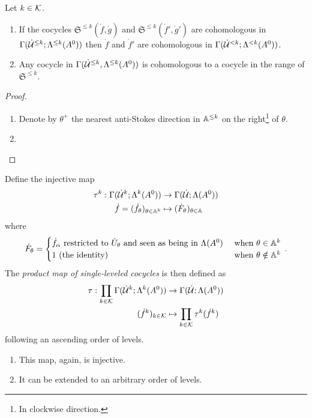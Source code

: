 \begin{lem}
  Let $k\in\mathcal{K}$.
  \begin{enumerate}
    \item If the cocycles $\mathfrak{S}^{\leq k}(\dot f,\dot g)$ and
      $\mathfrak{S}^{\leq k}(\dot f',\dot g')$ are cohomologous in
      $\Gamma(\dot{\mathcal{U}}^{\leq k};\Lambda^{\leq k}(A^0))$
      then $\dot f$ and $\dot f'$ are cohomologous in
      $\Gamma(\dot{\mathcal{U}}^{<k};\Lambda^{<k}(A^0))$.
    \item Any cocycle in $\Gamma(\dot{\mathcal{U}}^{\leq k},\Lambda^{\leq k}(A^0))$ is
      cohomologous to a cocycle in the range of $\mathfrak{S}^{\leq k}$.
  \end{enumerate}
\end{lem}
\begin{proof}
  \begin{enumerate}
    \item Denote by $\theta^+$ the nearest anti-Stokes direction in
      $\mathbb{A}^{\leq k}$ on the right\footnote{In clockwise direction.} of $\theta$.
      \TODO{}
    \item \TODO{}
  \end{enumerate}
  \TODO{}
\end{proof}
\begin{defn}
  Define the injective map
  \begin{align*}
    \tau^k:\Gamma(\dot{\mathcal{U}}^k;\Lambda^k(A^0)) &\to \Gamma(\dot{\mathcal{U}};\Lambda(A^0))
  \\\dot f=(\dot f_\theta)_{\theta\in\mathbb{A}^k} &\mapsto
    (\dot F_\theta)_{\theta\in\mathbb{A}}
  \end{align*}
  where
  \[
    \dot F_\theta=\begin{cases}
      \dot f_\alpha \text{~restricted to } \dot U_\theta
      \text{~and seen as being in } \Lambda(A^0)
      & \text{~when } \theta\in\mathbb{A}^k
    \\1 \text{~(the identity) }
      & \text{~when } \theta\notin\mathbb{A}^k
    \end{cases} \,.
  \]
  The \emph{product map of single-leveled cocycles} is then defined as
  \begin{align*}
    \tau:\prod_{k\in\mathcal{K}}\Gamma(\dot {\mathcal{U}}^k;\Lambda^k(A^0))
    &\to
    \Gamma(\dot{\mathcal{U}};\Lambda(A^0))
  \\(\dot f^k)_{k\in\mathcal{K}}
    &\mapsto
    \prod_{k\in\mathcal{K}}\tau^k(\dot f^k)
  \end{align*}
  following an ascending order of levels.
  \begin{s-rem}
    \begin{enumerate}
      \item This map, again, is injective.
        \TODO[proof?]
      \item It can be extended to an arbitrary order of levels.
    \end{enumerate}
  \end{s-rem}
\end{defn}
